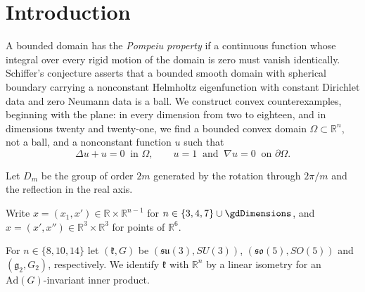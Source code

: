 \documentclass[11pt]{amsart}
\newcommand{\topdimword}{eighteen}
\theoremstyle{definition}
\theoremstyle{remark}
\numberwithin{equation}{section}
\newcommand{\R}{\mathbb{R}}
\begin{document}
\tableofcontents
\clearpage

\section{Introduction}\label{sec:intro}\label{r2:sec:intro}

A bounded domain has the \emph{Pompeiu property} if a continuous function whose integral over every rigid motion of the domain is zero must vanish identically. Schiffer's conjecture asserts that a bounded smooth domain with spherical boundary carrying a nonconstant Helmholtz eigenfunction with constant Dirichlet data and zero Neumann data is a ball. We construct convex counterexamples, beginning with the plane: in every dimension from two to \topdimword, and in dimensions twenty and twenty-one, we find a bounded convex domain $\Omega\subset\R^n$, not a ball, and a nonconstant function $u$ such that
\begin{equation}\label{eq:main}
\Delta u+u=0\ \text{ in }\Omega,\qquad u=1\ \text{ and }\ \nabla u=0\ \text{ on }\partial\Omega .
\end{equation}

Let $D_m$ be the group of order $2m$ generated by the rotation through $2\pi/m$ and the reflection in the real axis.

Write $x=(x_1,x')\in\R\times\R^{n-1}$ for $n\in\{3,4,7\}\cup\gdDimensions$, and $x=(x',x'')\in\R^3\times\R^3$ for points of $\R^6$.

For $n\in\{8,10,14\}$ let $(\mathfrak k,G)$ be $(\mathfrak{su}(3),SU(3))$, $(\mathfrak{so}(5),SO(5))$ and $(\mathfrak g_2,G_2)$, respectively. We identify $\mathfrak k$ with $\R^n$ by a linear isometry for an $\mathrm{Ad}(G)$-invariant inner product.
\end{document}
